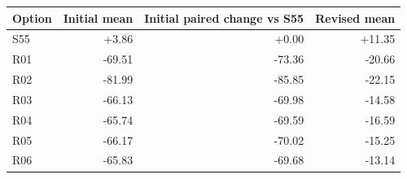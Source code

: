 \begin{tabular}{lrrr}
\toprule
Option & Initial mean & Initial paired change vs S55 & Revised mean \\
\midrule
S55 & +3.86 & +0.00 & +11.35 \\
R01 & -69.51 & -73.36 & -20.66 \\
R02 & -81.99 & -85.85 & -22.15 \\
R03 & -66.13 & -69.98 & -14.58 \\
R04 & -65.74 & -69.59 & -16.59 \\
R05 & -66.17 & -70.02 & -15.25 \\
R06 & -65.83 & -69.68 & -13.14 \\
\bottomrule
\end{tabular}
